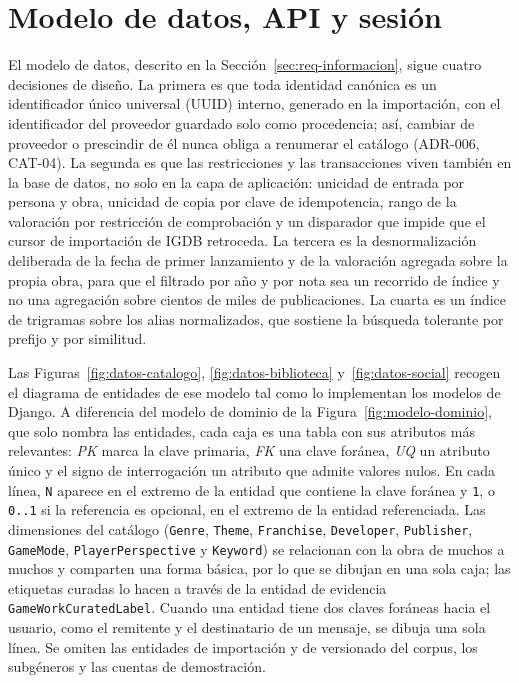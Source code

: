 \section{Modelo de datos, API y sesión}\label{sec:dis-modelo-datos}\label{sec:dis-api}\label{sec:dis-sesion}\label{sec:dis-frontera}

El modelo de datos, descrito en la Sección~\ref{sec:req-informacion}, sigue cuatro decisiones
de diseño. La primera es que toda identidad canónica es un identificador único universal
(UUID) interno, generado en la importación, con el identificador del proveedor guardado solo
como procedencia; así, cambiar de proveedor o prescindir de él nunca obliga a renumerar el
catálogo (ADR-006, CAT-04). La segunda es que las restricciones y las transacciones viven
también en la base de datos, no solo en la capa de aplicación: unicidad de entrada por
persona y obra, unicidad de copia por clave de idempotencia, rango de la valoración por
restricción de comprobación y un disparador que impide que el cursor de importación de IGDB
retroceda. La tercera es la desnormalización deliberada de la fecha de primer lanzamiento y
de la valoración agregada sobre la propia obra, para que el filtrado por año y por nota sea
un recorrido de índice y no una agregación sobre cientos de miles de publicaciones. La cuarta
es un índice de trigramas sobre los alias normalizados, que sostiene la búsqueda tolerante
por prefijo y por similitud.


Las Figuras~\ref{fig:datos-catalogo}, \ref{fig:datos-biblioteca} y~\ref{fig:datos-social}
recogen el diagrama de entidades de ese modelo tal como lo implementan los modelos de Django.
A diferencia del modelo de dominio de la Figura~\ref{fig:modelo-dominio}, que solo nombra las
entidades, cada caja es una tabla con sus atributos más relevantes: \textit{PK} marca la clave
primaria, \textit{FK} una clave foránea, \textit{UQ} un atributo único y el signo de
interrogación un atributo que admite valores nulos. En cada línea, \texttt{N} aparece en el
extremo de la entidad que contiene la clave foránea y \texttt{1}, o \texttt{0..1} si la
referencia es opcional, en el extremo de la entidad referenciada. Las dimensiones del catálogo
(\texttt{Genre}, \texttt{Theme}, \texttt{Franchise}, \texttt{Developer}, \texttt{Publisher},
\texttt{GameMode}, \texttt{PlayerPerspective} y \texttt{Keyword}) se relacionan con la obra de
muchos a muchos y comparten una forma básica, por lo que se dibujan en una sola caja; las
etiquetas curadas lo hacen a través de la entidad de evidencia \texttt{GameWorkCuratedLabel}.
Cuando una entidad tiene dos claves foráneas hacia el usuario, como el remitente y el
destinatario de un mensaje, se dibuja una sola línea. Se omiten las entidades de importación y
de versionado del corpus, los subgéneros y las cuentas de demostración.

